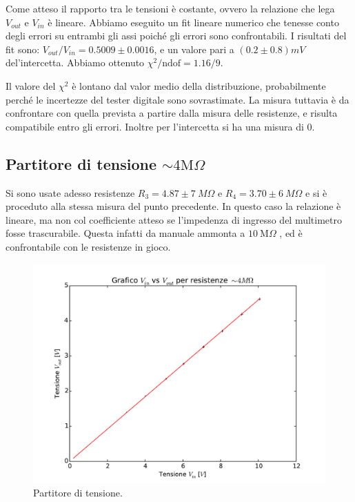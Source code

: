 \documentclass[10pt,a4paper]{article}
\begin{document}
Come atteso il rapporto tra le tensioni è costante, ovvero la relazione che lega $V_{out}$ e $V_{in}$ è lineare.
Abbiamo eseguito un fit lineare numerico che tenesse conto degli errori su entrambi gli assi poiché gli errori sono confrontabili. I risultati del fit sono: $V_{out}/V_{in}=0.5009 \pm 0.0016$, e un valore pari a $(0.2\pm 0.8) mV$ del'intercetta. Abbiamo ottenuto  $\chi^2/\text{ndof}= 1.16/9$.

Il valore del $\chi^2$ è lontano dal valor medio della distribuzione, probabilmente perché le incertezze del tester digitale sono sovrastimate. La misura tuttavia è da confrontare con quella prevista a partire dalla misura delle resistenze, e risulta compatibile entro gli errori. Inoltre per l'intercetta si ha una misura di $0$.

\subsection{Partitore di tensione $\sim4\text{M}\Omega$}
Si sono usate adesso resistenze $R_3=4.87 \pm 7 ~M\Omega$ e $R_4=3.70 \pm 6 ~M\Omega$ e si è proceduto alla stessa misura del punto precedente. In questo caso la relazione è lineare, ma non col coefficiente atteso se l'impedenza di ingresso del multimetro fosse trascurabile. Questa infatti da manuale ammonta a $10 ~ \text{M}\Omega$ , ed è confrontabile con le resistenze in gioco.


\begin{figure}[h]
	\centering
	\includegraphics[scale=0.6]{../grafici/fit_4MOhm.pdf}
	\caption{Partitore di tensione.}
	\label{f:par2}
\end{figure}
\end{document}
